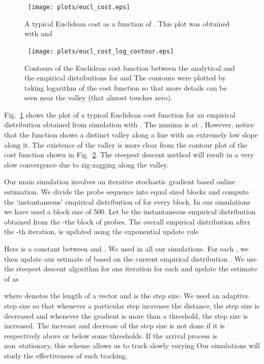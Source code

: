 \documentclass[11pt]{article}
\begin{document}
\begin{figure}
  \begin{center}
    \ \texttt{[image: plots/eucl\_cost.eps]}
  \end{center}
  \caption{A typical Euclidean cost as a function of . This plot was obtained with  and
    }
  \label{fig_cost}
\end{figure}
\begin{figure}
  \begin{center}
    \ \texttt{[image: plots/eucl\_cost\_log\_contour.eps]}
  \end{center}
  \caption{Contours of the Euclidean cost function between the
    analytical and the empirical distributions for  and
     The contours were plotted by taking logarithm of
    the cost function so that more details can be seen near the valley
    (that almost touches zero).  }
  \label{fig_contour}
\end{figure}

Fig.~\ref{fig_cost} shows the plot of a typical Euclidean cost
function for an empirical distribution obtained from simulation with
. The minima is at .
However, notice that the function shows a distinct valley along a line
with an extremely low slope along it.  The existence of the valley is
more clear from the contour plot of the cost function shown in
Fig.~\ref{fig_contour}. The steepest descent method will result in a
very slow convergence due to zig-zagging along the valley.
 
Our main simulation involves an iterative stochastic gradient based
online estimation. We divide the probe sequence into equal sized
blocks and compute the `instantaneous' empirical distribution of
 for every block. In our simulations we have used a block
size of 500. Let  be the
instantaneous empirical distribution obtained from the -the block
of probes. The overall empirical distribution after the -th
iteration,  is updated using the
exponential update rule

Here  is a constant between  and . We used  in all
our simulations. For each , we then update our estimate of
 based on the current empirical distribution
. We use the steepest descent algorithm for
one iteration for each  and update the estimate of
 as

where  denotes the length of a vector and  is the
step size.  We used an adaptive step size so that whenever a
particular step increases the distance, the step size is decreased and
whenever the gradient is more than a threshold, the step size is
increased. The increase and decrease of the step size is not done if
it is respectively above or below some thresholds.  
If the arrival process is non~stationary, this scheme allows us to
track slowly varying  Our simulations will study
the effectiveness of such tracking.
\end{document}
